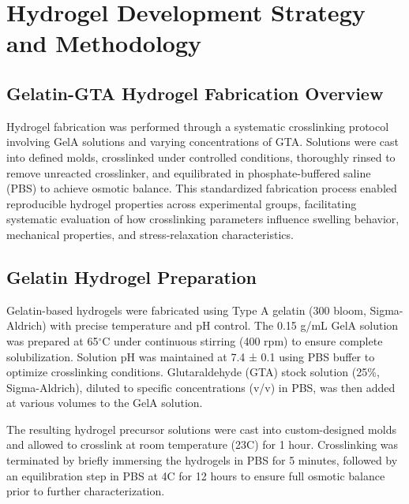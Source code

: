 \section{Hydrogel Development Strategy and Methodology} \label{sec:ch2_methods}

\subsection{Gelatin-GTA Hydrogel Fabrication Overview}
Hydrogel fabrication was performed through a systematic crosslinking protocol involving GelA solutions and varying concentrations of GTA. Solutions were cast into defined molds, crosslinked under controlled conditions, thoroughly rinsed to remove unreacted crosslinker, and equilibrated in phosphate-buffered saline (PBS) to achieve osmotic balance. This standardized fabrication process enabled reproducible hydrogel properties across experimental groups, facilitating systematic evaluation of how crosslinking parameters influence swelling behavior, mechanical properties, and stress-relaxation characteristics.

\subsection{Gelatin Hydrogel Preparation}

Gelatin-based hydrogels were fabricated using Type A gelatin (300 bloom, Sigma-Aldrich) with precise temperature and pH control. The 0.15 g/mL GelA solution was prepared at 65$^\circ$C under continuous stirring (400 rpm) to ensure complete solubilization. Solution pH was maintained at 7.4 ± 0.1 using PBS buffer to optimize crosslinking conditions. Glutaraldehyde (GTA) stock solution (25\%, Sigma-Aldrich), diluted to specific concentrations (v/v) in PBS, was then added at various volumes to the GelA solution.

The resulting hydrogel precursor solutions were cast into custom-designed molds and allowed to crosslink at room temperature (23\textdegree C) for 1 hour. Crosslinking was terminated by briefly immersing the hydrogels in PBS for 5 minutes, followed by an equilibration step in PBS at 4\textdegree C for 12 hours to ensure full osmotic balance prior to further characterization.

